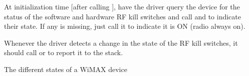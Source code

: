 \documentclass[a4paper,8pt,english]{sphinxmanual}
\begin{document}
At initialization time {[}after calling {\hyperref[networking/kapi:c.wimax_dev_add]{\emph{}}}{]}, have the
driver query the device for the status of the software and hardware
RF kill switches and call {\hyperref[networking/kapi:c.wimax_report_rfkill_hw]{\emph{}}} and
 to indicate their state. If any is
missing, just call it to indicate it is ON (radio always on).

Whenever the driver detects a change in the state of the RF kill
switches, it should call {\hyperref[networking/kapi:c.wimax_report_rfkill_hw]{\emph{}}} or
{\hyperref[networking/kapi:c.wimax_report_rfkill_sw]{\emph{}}} to report it to the stack.

\begin{fulllineitems}
\label{networking/kapi:c.wimax_st}
The different states of a WiMAX device

\end{fulllineitems}
\end{document}
